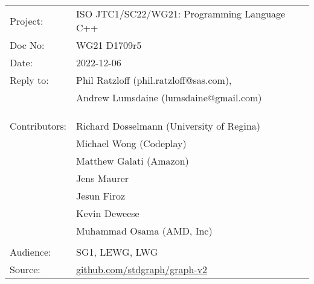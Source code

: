 \documentclass[10pt,oneside,openany,final]{memoir}
\begin{document}
\pagestyle{cpppage}


\begin{tabular}{@{}ll}
  Project:      & ISO JTC1/SC22/WG21: Programming Language C++           \\
  Doc No:       & WG21 D1709r5                                           \\
  Date:         & 2022-12-06                                             \\
  Reply to:     & Phil Ratzloff (phil.ratzloff@sas.com),                 \\
                & Andrew Lumsdaine (lumsdaine@gmail.com)                 \\
                &                                                        \\
                &                                                        \\
                &                                                        \\
  Contributors: & Richard Dosselmann (University of Regina)              \\
                & Michael Wong (Codeplay)                                \\
                & Matthew Galati (Amazon)                                \\
                & Jens Maurer                                            \\
                & Jesun Firoz                                            \\
                & Kevin Deweese                                          \\
                & Muhammad Osama (AMD, Inc)                              \\
                &                                                        \\
  Audience:     & SG1, LEWG, LWG                                         \\
  Source:       & \href{https://github.com/stdgraph/graph-v2}{github.com/stdgraph/graph-v2}    \\
\end{tabular}
\end{document}
